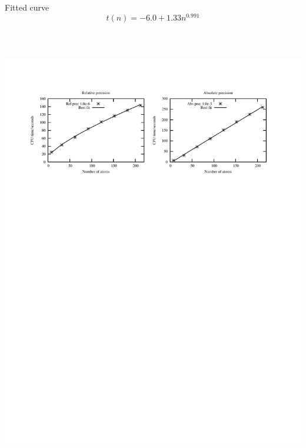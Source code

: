 \documentclass[mathserif, 10pt]{beamer}
\begin{document}
\begin{frame}
\begin{columns}
\begin{column}{.50\textwidth}
\begin{figure}
	\end{figure}
	Fitted curve
	\begin{equation}
	    \nonumber
	    t(n) = -6.0 + 1.33n^{0.991}
	\end{equation}
    \end{column}
    \end{columns}    
    \ \\
    \begin{center}
	\includegraphics[scale=0.6, clip, viewport = 50 550 540 730]{figures/linearScaling.pdf}
    \end{center}
\end{frame}
\end{document}
